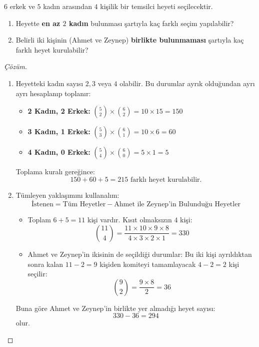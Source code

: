 \begin{example}
$6$ erkek ve $5$ kadın arasından $4$ kişilik bir temsilci heyeti seçilecektir.
\begin{enumerate}
  \item Heyette \textbf{en az $2$ kadın} bulunması şartıyla kaç farklı seçim yapılabilir?
  \item Belirli iki kişinin (Ahmet ve Zeynep) \textbf{birlikte bulunmaması} şartıyla kaç farklı heyet kurulabilir?
\end{enumerate}
\end{example}
\begin{proof}[Çözüm]
\begin{enumerate}
  \item Heyetteki kadın sayısı $2, 3$ veya $4$ olabilir. Bu durumlar ayrık olduğundan ayrı ayrı hesaplanıp toplanır:
  \begin{itemize}
    \item \textbf{2 Kadın, 2 Erkek:} $\binom{5}{2} \times \binom{6}{2} = 10 \times 15 = 150$
    \item \textbf{3 Kadın, 1 Erkek:} $\binom{5}{3} \times \binom{6}{1} = 10 \times 6 = 60$
    \item \textbf{4 Kadın, 0 Erkek:} $\binom{5}{4} \times \binom{6}{0} = 5 \times 1 = 5$
  \end{itemize}
  Toplama kuralı gereğince:
  \[ 150 + 60 + 5 = 215 \text{ farklı heyet kurulabilir.} \]

  \item Tümleyen yaklaşımını kullanalım:
  \[ \text{İstenen} = \text{Tüm Heyetler} - \text{Ahmet ile Zeynep'in Bulunduğu Heyetler} \]
  \begin{itemize}
    \item Toplam $6 + 5 = 11$ kişi vardır. Kısıt olmaksızın $4$ kişi:
    \[ \binom{11}{4} = \frac{11 \times 10 \times 9 \times 8}{4 \times 3 \times 2 \times 1} = 330 \]
    \item Ahmet ve Zeynep'in ikisinin de seçildiği durumlar: Bu iki kişi ayrıldıktan sonra kalan $11 - 2 = 9$ kişiden komiteyi tamamlayacak $4 - 2 = 2$ kişi seçilir:
    \[ \binom{9}{2} = \frac{9 \times 8}{2} = 36 \]
  \end{itemize}
  Buna göre Ahmet ve Zeynep'in birlikte yer almadığı heyet sayısı:
  \[ 330 - 36 = 294 \]
  olur.
\end{enumerate}
\end{proof}

